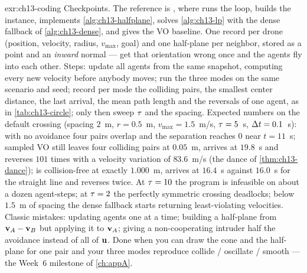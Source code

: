 
\begin{solution}{exr:ch13-coding}
Checkpoints. The reference is , where  runs the loop,
 builds the instance,  implements
\cref{alg:ch13-halfplane},  solves \cref{alg:ch13-lp} with the dense
fallback of \cref{alg:ch13-dense}, and  gives the VO baseline. One
 record per drone (position, velocity, radius, $v_{\max}$, goal) and one
half-plane per neighbor, stored as a point and an \emph{inward} normal --- get that
orientation wrong once and the agents fly into each other. Steps: update all agents from
the same snapshot, computing every new velocity before anybody moves; run the three modes
on the same scenario and seed; record per mode the colliding pairs, the smallest center
distance, the last arrival, the mean path length and the reversals of one agent, as in
\cref{tab:ch13-circle}; only then sweep $\tau$ and the spacing. Expected numbers on the
default crossing (spacing $2$~m, $r=0.5$~m, $v_{\max}=1.5$~m/s, $\tau=5$~s, $\Delta t=0.1$~s):
with no avoidance four pairs overlap and the separation reaches $0$ near $t=11$~s; sampled
VO still leaves four colliding pairs at $0.05$~m, arrives at $19.8$~s and reverses $101$
times with a velocity variation of $83.6$~m/s (the dance of \cref{thm:ch13-dance}); \orca
is collision-free at exactly $1.000$~m, arrives at $16.4$~s against $16.0$~s for the
straight line and reverses twice. At $\tau=10$ the program is infeasible on about a dozen
agent-steps; at $\tau=2$ the perfectly symmetric crossing deadlocks; below $1.5$~m of
spacing the dense fallback starts returning least-violating velocities. Classic mistakes:
updating agents one at a time; building a half-plane from $\mathbf{v}_A-\mathbf{v}_B$ but applying it
to $\mathbf{v}_A$; giving a non-cooperating intruder half the avoidance instead of all of
$\mathbf{u}$. Done when you can draw the cone and the half-plane for one pair and your three
modes reproduce collide / oscillate / smooth --- the Week~6 milestone of \cref{ch:appA}.
\end{solution}

